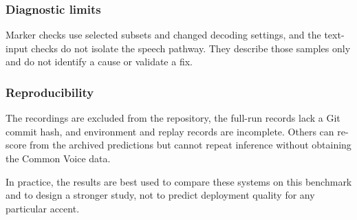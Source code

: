 \subsubsection{Diagnostic limits}
Marker checks use selected subsets and changed decoding settings,
and the text-input checks do not isolate the speech pathway. They
describe those samples only and do not identify a cause or validate
a fix.

\subsubsection{Reproducibility}
The recordings are excluded from the repository, the full-run
records lack a Git commit hash, and environment and replay records
are incomplete. Others can re-score from the archived predictions
but cannot repeat inference without obtaining the Common Voice data.

In practice, the results are best used to compare these systems on this
benchmark and to design a stronger study, not to predict deployment
quality for any particular accent.

